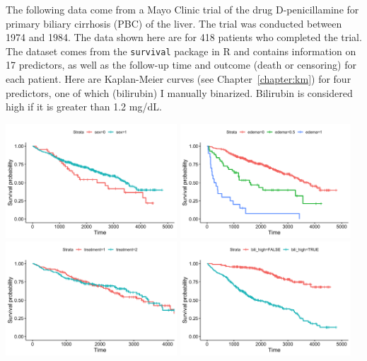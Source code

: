 \begin{question}{}
The following data come from a Mayo Clinic trial of the drug D-penicillamine for primary biliary cirrhosis (PBC) of the liver. The trial was conducted between 1974 and 1984. The data shown here are for 418 patients who completed the trial. The dataset comes from the \texttt{survival} package in R and contains information on 17 predictors, as well as the follow-up time and outcome (death or censoring) for each patient. Here are Kaplan-Meier curves (see Chapter~\ref{chapter:km}) for four predictors, one of which (bilirubin) I manually binarized. Bilirubin is considered high if it is greater than 1.2 mg/dL.

\begin{center}
\includegraphics[width=0.48\textwidth]{img/rf-surv-example-1.png}
\includegraphics[width=0.48\textwidth]{img/rf-surv-example-2.png}
\includegraphics[width=0.48\textwidth]{img/rf-surv-example-3.png}
\includegraphics[width=0.48\textwidth]{img/rf-surv-example-4.png}
\end{center}


\end{question}
